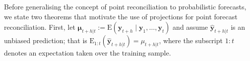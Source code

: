 \documentclass[a4paper, 11pt]{article}
\def\E{\text{E}}
\theoremstyle{definition}
\begin{document}

%
%

Before generalising the concept of point reconciliation to probabilistic forecasts, we state two theorems that motivate the use of projections for point forecast reconciliation. First, let $\bm{\mu}_{t+h|t}:=\E(\bm{y}_{t+h}\mid\bm{y}_{1},\dots,\bm{y}_{t})$ and assume $\hat{\bm{y}}_{t+h|t}$ is an unbiased prediction; that is $\E_{1:t}(\hat{\bm{y}}_{t+h|t})=\mu_{t+h|t}$, where the subscript $1:t$ denotes an expectation taken over the training sample.
\end{document}
